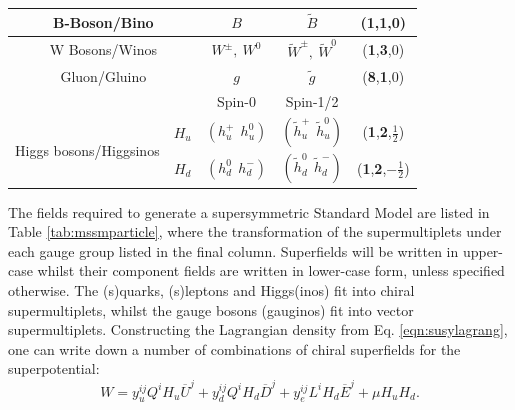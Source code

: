 \begin{table}[t]
\begin{tabular}{|c|c|c|c|c|}
\multicolumn{2}{|c|}{B-Boson/Bino}                           & $B$                                                 & $\tilde{B}$                         & (\textbf{1},\textbf{1},0)                           \\ \hline
\multicolumn{2}{|c|}{W Bosons/Winos}                         & $W^{\pm},~W^{0}$                                    & $\tilde{W}^{\pm},~\tilde{W}^{0}$    & (\textbf{1},\textbf{3},0)                           \\ \hline
\multicolumn{2}{|c|}{Gluon/Gluino}                           & $g$                                                 & $\tilde{g}$                         & (\textbf{8},\textbf{1},0)                           \\ \hline
\multicolumn{2}{|c|}{}                                       & Spin-0                                              & Spin-1/2                            &                                                         \\ \hline
\multirow{2}{*}{Higgs bosons/Higgsinos}            & $H_u$          & $\left ( h^{+}_{u} ~~ h^{0}_{u} \right )$                                                    & $\left ( \tilde{h}^{+}_{u} ~~ \tilde{h}^{0}_{u} \right )$                                    & (\textbf{1},\textbf{2},$\frac{1}{2}$)               \\
                                            & $H_d$          & $\left ( h^{0}_{d} ~~ h^{-}_{d} \right )$                                                    & $\left ( \tilde{h}^{0}_{d} ~~ \tilde{h}^{-}_{d} \right )$                                    & (\textbf{1},\textbf{2},$-\frac{1}{2}$)              \\ \hline
\end{tabular}
\end{table}
The fields required to generate a supersymmetric Standard Model are listed in Table \ref{tab:mssmparticle}, where the transformation of the supermultiplets under each gauge group listed in the final column. Superfields will be written in upper-case whilst their component fields are written in lower-case form, unless specified otherwise. The (s)quarks, (s)leptons and Higgs(inos) fit into chiral supermultiplets, whilst the gauge bosons (gauginos) fit into vector supermultiplets. Constructing the Lagrangian density from Eq. \ref{eqn:susylagrang}, one can write down a number of combinations of chiral superfields for the superpotential:
\begin{equation}
W=y^{ij}_{u}Q^{i}H_{u}\overline{U}^{j}+y^{ij}_{d}Q^{i}H_{d}\overline{D}^{j}+y^{ij}_{e}L^{i}H_{d}\overline{E}^{j}+\mu H_{u}H_{d}.
\label{eqn:W}
\end{equation}
